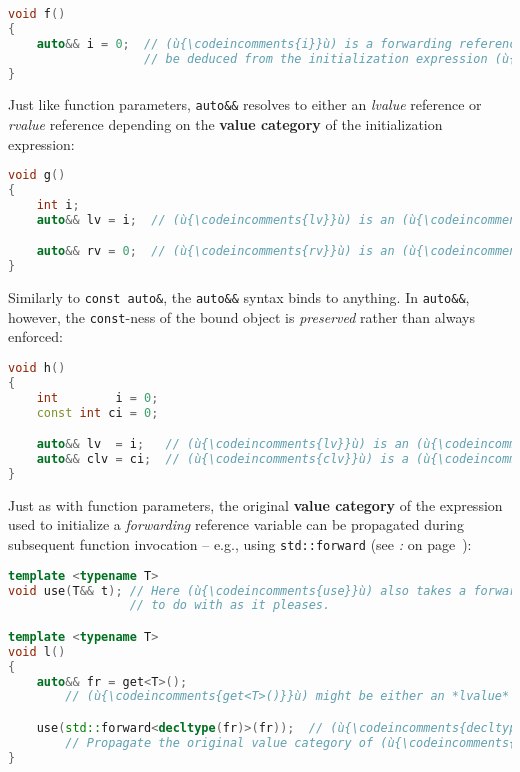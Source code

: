 \begin{lstlisting}[language=C++]
void f()
{
    auto&& i = 0;  // (ù{\codeincomments{i}}ù) is a forwarding reference because the type of (ù{\codeincomments{i}}ù) must
                   // be deduced from the initialization expression (ù{\codeincomments{0}}ù).
}
\end{lstlisting}

\noindent Just like function parameters, \texttt{auto\&\&} resolves to either an
\emph{lvalue} reference or \emph{rvalue} reference depending on the
\textbf{value category} of the initialization expression:

\begin{lstlisting}[language=C++]
void g()
{
    int i;
    auto&& lv = i;  // (ù{\codeincomments{lv}}ù) is an (ù{\codeincomments{int\&}}ù).

    auto&& rv = 0;  // (ù{\codeincomments{rv}}ù) is an (ù{\codeincomments{int\&\&}}ù).
}
\end{lstlisting}

\noindent Similarly to \texttt{const}~\texttt{auto\&}, the \texttt{auto\&\&}
syntax binds to anything. In \texttt{auto\&\&}, however, the
\texttt{const}-ness of the bound object is \emph{preserved} rather than
always enforced:

\begin{lstlisting}[language=C++]
void h()
{
    int        i = 0;
    const int ci = 0;

    auto&& lv  = i;   // (ù{\codeincomments{lv}}ù) is an (ù{\codeincomments{int\&}}ù).
    auto&& clv = ci;  // (ù{\codeincomments{clv}}ù) is a (ù{\codeincomments{const int\&}}ù).
}
\end{lstlisting}

\noindent Just as with function parameters, the original \textbf{value category}
of the expression used to initialize a \emph{forwarding} reference
variable can be propagated during subsequent function invocation --
e.g., using \texttt{std::forward} (see \textit{: } on page~\pageref{the-std::forward-utility}):

\begin{lstlisting}[language=C++]
template <typename T>
void use(T&& t); // Here (ù{\codeincomments{use}}ù) also takes a forwarding reference parameter
                 // to do with as it pleases.

template <typename T>
void l()
{
    auto&& fr = get<T>();
        // (ù{\codeincomments{get<T>()}}ù) might be either an *lvalue* or *rvalue* depending on (ù{\codeincomments{T}}ù).

    use(std::forward<decltype(fr)>(fr));  // (ù{\codeincomments{decltype}}ù) is a C++11 feature.
        // Propagate the original value category of (ù{\codeincomments{get<T>()}}ù) into (ù{\codeincomments{use}}ù).
}
\end{lstlisting}

